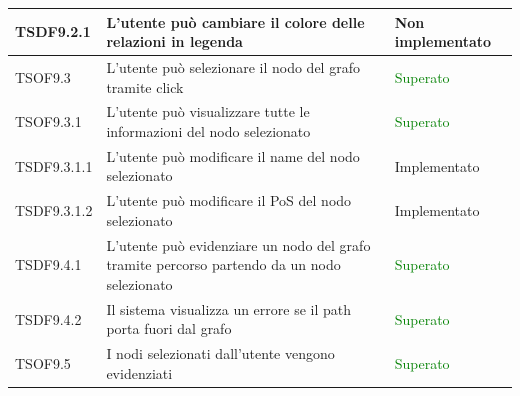 \documentclass[openany,12pt,a4paper]{report}
\begin{document}
\begin{longtable}{| p{2cm} |p{8cm} | p{2.5cm} |}
	\newline TSDF9.2.1&
	\newline L'utente può cambiare il colore delle relazioni in legenda&
	\newline Non implementato
	\\[1em]
	\hline
	
	\newline TSOF9.3&
	\newline L'utente può selezionare il nodo del grafo tramite click&
	\newline \textcolor{green}{Superato}
	\\[1em]
	\hline
	
	\newline TSOF9.3.1&
	\newline L'utente può visualizzare tutte le informazioni del nodo selezionato&
	\newline \textcolor{green}{Superato}
	\\[1em]
	\hline
	
	\newline TSDF9.3.1.1&
	\newline L'utente può modificare il name del nodo selezionato&
	\newline Implementato
	\\[1em]
	\hline
	
	\newline TSDF9.3.1.2&
	\newline L'utente può modificare il PoS del nodo selezionato&
	\newline Implementato
	\\[1em]
	\hline
	
	\newline TSDF9.4.1&
	\newline L'utente può evidenziare un nodo del grafo tramite percorso partendo da un nodo selezionato&
	\newline \textcolor{green}{Superato}
	\\[1em]
	\hline
	
	\newline TSDF9.4.2&
	\newline Il sistema visualizza un errore se il path porta fuori dal grafo&
	\newline \textcolor{green}{Superato}
	\\[1em]
	\hline
	
	\newline TSOF9.5&
	\newline I nodi selezionati dall'utente vengono evidenziati&
	\newline \textcolor{green}{Superato}
	\\[1em]
	\hline
	

\end{longtable}
\end{document}
